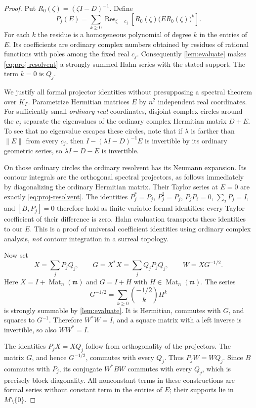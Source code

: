 \documentclass[11pt,letterpaper]{article}
\numberwithin{equation}{section}
\theoremstyle{definition}
\theoremstyle{remark}
\newcommand{\mm}{\mathfrak m}
\newcommand{\Mat}{\operatorname{Mat}}
\newcommand{\Res}{\operatorname{Res}}
\newcommand{\KG}{K_{\Gamma}}
\begin{document}
\begin{proof}
Put $R_0(\zeta)=(\zeta I-D)^{-1}$. Define
\begin{equation}\label{eq:proj-resolvent}
 P_j(E)=\sum_{k\ge0}\Res_{\zeta=c_j}
       \left[R_0(\zeta)\bigl(E R_0(\zeta)\bigr)^k\right].
\end{equation}
For each $k$ the residue is a homogeneous polynomial of degree $k$ in the
entries of $E$. Its coefficients are ordinary complex numbers obtained by
residues of rational functions with poles among the fixed real $c_j$.
Consequently \cref{lem:evaluate} makes \cref{eq:proj-resolvent} a strongly
summed Hahn series with the stated support. The term $k=0$ is $Q_j$.

We justify all formal projector identities without presupposing a spectral
theorem over $\KG$. Parametrize Hermitian matrices $E$ by $n^2$ independent
real coordinates. For sufficiently small \emph{ordinary real} coordinates,
disjoint complex circles around the $c_j$ separate the eigenvalues of the
ordinary complex Hermitian matrix $D+E$. To see that no eigenvalue escapes
these circles, note that if $\lambda$ is farther than $\|E\|$ from every
$c_j$, then $I-(\lambda I-D)^{-1}E$ is invertible by its ordinary geometric
series, so $\lambda I-D-E$ is invertible.

On those ordinary circles the ordinary resolvent has its Neumann expansion.
Its contour integrals are the orthogonal spectral projectors, as follows
immediately by diagonalizing the ordinary Hermitian matrix. Their Taylor
series at $E=0$ are exactly \cref{eq:proj-resolvent}. The identities
$P_j^*=P_j$, $P_j^2=P_j$, $P_jP_\ell=0$, $\sum_jP_j=I$, and $[B,P_j]=0$
therefore hold as finite-variable formal identities: every Taylor coefficient
of their difference is zero. Hahn evaluation transports these identities to
our $E$. This is a proof of universal coefficient identities using ordinary
complex analysis, \emph{not} contour integration in a surreal topology.

Now set
\begin{equation}\label{eq:polar-intertwiner}
 X=\sum_jP_jQ_j,
 \qquad G=X^*X=\sum_jQ_jP_jQ_j,
 \qquad W=XG^{-1/2}.
\end{equation}
Here $X=I+\Mat_n(\mm)$ and $G=I+H$ with $H\in\Mat_n(\mm)$. The series
\begin{equation}\label{eq:Groot}
 G^{-1/2}=\sum_{k\ge0}\binom{-1/2}{k}H^k
\end{equation}
is strongly summable by \cref{lem:evaluate}. It is Hermitian, commutes with
$G$, and squares to $G^{-1}$. Therefore $W^*W=I$, and a square matrix with a
left inverse is invertible, so also $WW^*=I$.

The identities $P_jX=XQ_j$ follow from orthogonality of the projectors.
The matrix $G$, and hence $G^{-1/2}$, commutes with every $Q_j$.
Thus $P_jW=WQ_j$. Since $B$ commutes with $P_j$, its conjugate $W^*BW$
commutes with every $Q_j$, which is precisely block diagonality.
All nonconstant terms in these constructions are formal series without
constant term in the entries of $E$; their supports lie in
$M\setminus\{0\}$.
\end{proof}
\end{document}
